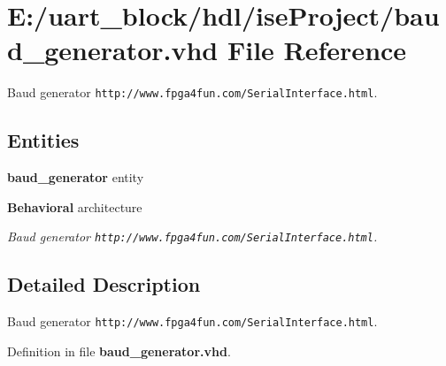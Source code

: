 \section{E\-:/uart\-\_\-block/hdl/ise\-Project/baud\-\_\-generator.vhd File Reference}
\label{baud__generator_8vhd}


Baud generator {\tt http\-://www.\-fpga4fun.\-com/\-Serial\-Interface.\-html}.  


\subsection*{Entities}
\begin{DoxyCompactItemize}
\item 
{\bf baud\-\_\-generator} entity
\item 
{\bf Behavioral} architecture
\begin{DoxyCompactList}\small\item\em Baud generator {\tt http\-://www.\-fpga4fun.\-com/\-Serial\-Interface.\-html}. \end{DoxyCompactList}\end{DoxyCompactItemize}


\subsection{Detailed Description}
Baud generator {\tt http\-://www.\-fpga4fun.\-com/\-Serial\-Interface.\-html}. 

Definition in file {\bf baud\-\_\-generator.\-vhd}.

